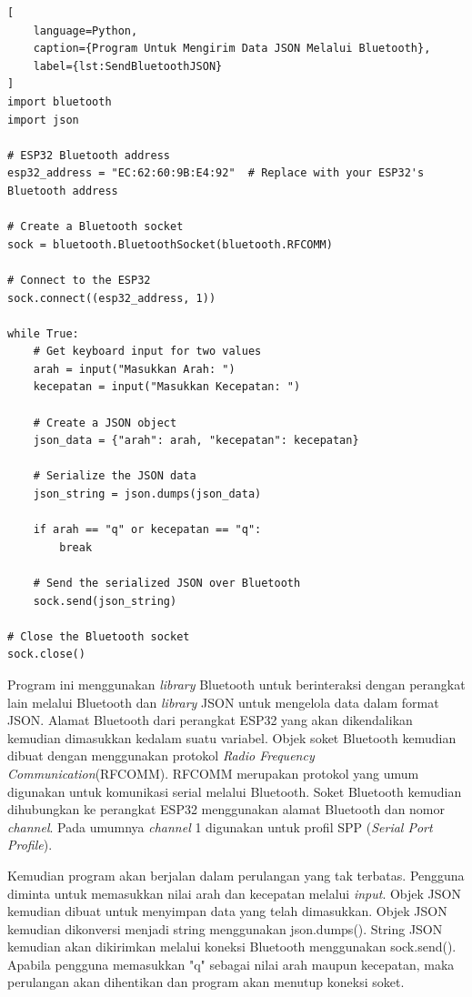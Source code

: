 \begin{lstlisting}[
    language=Python,
    caption={Program Untuk Mengirim Data JSON Melalui Bluetooth},
    label={lst:SendBluetoothJSON}
]
import bluetooth
import json

# ESP32 Bluetooth address
esp32_address = "EC:62:60:9B:E4:92"  # Replace with your ESP32's Bluetooth address

# Create a Bluetooth socket
sock = bluetooth.BluetoothSocket(bluetooth.RFCOMM)

# Connect to the ESP32
sock.connect((esp32_address, 1))

while True:
    # Get keyboard input for two values
    arah = input("Masukkan Arah: ")
    kecepatan = input("Masukkan Kecepatan: ")
    
    # Create a JSON object
    json_data = {"arah": arah, "kecepatan": kecepatan}

    # Serialize the JSON data
    json_string = json.dumps(json_data)
    
    if arah == "q" or kecepatan == "q":
        break

    # Send the serialized JSON over Bluetooth
    sock.send(json_string)

# Close the Bluetooth socket
sock.close()

\end{lstlisting}

Program ini menggunakan \emph{library} Bluetooth untuk berinteraksi dengan perangkat lain melalui Bluetooth dan \emph{library} JSON untuk mengelola data dalam format JSON. Alamat Bluetooth dari perangkat ESP32 yang akan dikendalikan kemudian dimasukkan kedalam suatu variabel. Objek soket Bluetooth kemudian dibuat dengan menggunakan protokol \emph{Radio Frequency Communication}(RFCOMM). RFCOMM merupakan protokol yang umum digunakan untuk komunikasi serial melalui Bluetooth. Soket Bluetooth kemudian dihubungkan ke perangkat ESP32 menggunakan alamat Bluetooth dan nomor \emph{channel}. Pada umumnya \emph{channel} 1 digunakan untuk profil SPP (\emph{Serial Port Profile}).

Kemudian program akan berjalan dalam perulangan yang tak terbatas. Pengguna diminta untuk memasukkan nilai arah dan kecepatan melalui \emph{input}. Objek JSON kemudian dibuat untuk menyimpan data yang telah dimasukkan. Objek JSON kemudian dikonversi menjadi string menggunakan json.dumps(). String JSON kemudian akan dikirimkan melalui koneksi Bluetooth menggunakan sock.send(). Apabila pengguna memasukkan "q" sebagai nilai arah maupun kecepatan, maka perulangan akan dihentikan dan program akan menutup koneksi soket.

